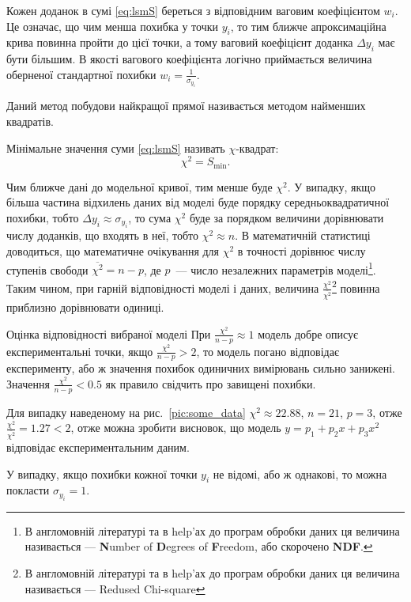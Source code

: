 \documentclass{LabBook}
\begin{document}
Кожен доданок в сумі \eqref{eq:lsmS} береться з відповідним ваговим коефіцієнтом $w_i$. Це означає, що чим менша похибка у точки $y_i$, то тим ближче апроксимаційна крива повинна пройти до цієї точки, а тому ваговий коефіцієнт доданка $\Delta y_i$ має бути більшим. В якості вагового коефіцієнта логічно приймається величина оберненої стандартної похибки $w_i = \frac1{\sigma_{y_i}}$.

Даний метод побудови найкращої прямої називається методом найменших квадратів.

Мінімальне значення суми \eqref{eq:lsmS} називать $\chi$-квадрат:
\begin{equation}\label{eq:defchi}
	\chi^2 = S_{\min}.
\end{equation}

Чим ближче дані до модельної кривої, тим менше буде $\chi^2$. У випадку, якщо більша частина відхилень даних від моделі буде порядку середньоквадратичної похибки, тобто $\Delta y_i \approx \sigma_{y_i}$, то сума $\chi^2$ буде за порядком величини дорівнювати числу доданків, що входять в неї, тобто $\chi^2 \approx n$.  В математичній статистиці доводиться, що математичне очікування для $\chi^2$  в точності дорівнює числу ступенів свободи $\overline{\chi^2} = n - p$, де $p$~--- число незалежних параметрів моделі\footnote{В англомовній літературі та в help'ах до програм обробки даних ця величина називається --- \textbf{N}umber of \textbf{D}egrees of \textbf{F}reedom, або скорочено \textbf{NDF}.}. Таким чином, при гарній відповідності моделі і даних, величина $\frac{\chi^2}{\overline{\chi^2}}$\footnote{В англомовній літературі та в help'ах до програм обробки даних ця величина називається --- Redused Chi-square} повинна приблизно дорівнювати одиниці.

\begin{More}{Оцінка відповідності вибраної моделі}
	При $\frac{\chi^2}{n-p} \approx 1$ модель добре описує експериментальні точки, якщо $\frac{\chi^2}{n-p} > 2$, то модель погано відповідає експерименту, або ж значення похибок одиничних вимірювань сильно занижені.
	Значення $\frac{\chi^2}{n-p} < 0.5$ як правило свідчить про завищені похибки.
\end{More}

Для випадку наведеному на рис.~\ref{pic:some_data} $\chi^2 \approx 22.88$, $n = 21$, $ p = 3$, отже $\frac{\chi^2}{\overline{\chi^2}} = 1.27 < 2$, отже можна зробити висновок, що модель $y = p_1 + p_2 x + p_3 x^2$ відповідає експериментальним даним.

У випадку, якщо похибки кожної точки $y_i$ не відомі, або ж однакові, то можна покласти $\sigma_{y_i} = 1$.
\end{document}
